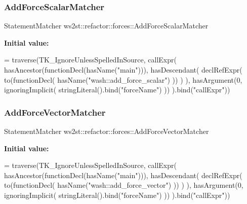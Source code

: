 \subsubsection{\texorpdfstring{Add\+Force\+Scalar\+Matcher}{AddForceScalarMatcher}}
{\footnotesize\ttfamily Statement\+Matcher ws2st\+::refactor\+::forces\+::\+Add\+Force\+Scalar\+Matcher}

{\bfseries Initial value\+:}
\begin{DoxyCode}
= traverse(TK\_IgnoreUnlessSpelledInSource, callExpr(
        hasAncestor(functionDecl(hasName(\textcolor{stringliteral}{"main"}))),
        hasDescendant(
            declRefExpr(
                to(functionDecl(
                    hasName(\textcolor{stringliteral}{"wash::add\_force\_scalar"})
                ))
            )
        ),
        hasArgument(0, ignoringImplicit( stringLiteral().bind(\textcolor{stringliteral}{"forceName"}) ))
    ).bind(\textcolor{stringliteral}{"callExpr"}))
\end{DoxyCode}
\mbox{\label{namespacews2st_1_1refactor_1_1forces_a7dfd24ab66dba074524ca3dfe669020b}} 
\subsubsection{\texorpdfstring{Add\+Force\+Vector\+Matcher}{AddForceVectorMatcher}}
{\footnotesize\ttfamily Statement\+Matcher ws2st\+::refactor\+::forces\+::\+Add\+Force\+Vector\+Matcher}

{\bfseries Initial value\+:}
\begin{DoxyCode}
= traverse(TK\_IgnoreUnlessSpelledInSource, callExpr(
        hasAncestor(functionDecl(hasName(\textcolor{stringliteral}{"main"}))),
        hasDescendant(
            declRefExpr(
                to(functionDecl(
                    hasName(\textcolor{stringliteral}{"wash::add\_force\_vector"})
                ))
            )
        ),
        hasArgument(0, ignoringImplicit( stringLiteral().bind(\textcolor{stringliteral}{"forceName"}) ))
    ).bind(\textcolor{stringliteral}{"callExpr"}))
\end{DoxyCode}
\mbox{\label{namespacews2st_1_1refactor_1_1forces_a917d202a64bef4322ddadba831b71aa6}} 
